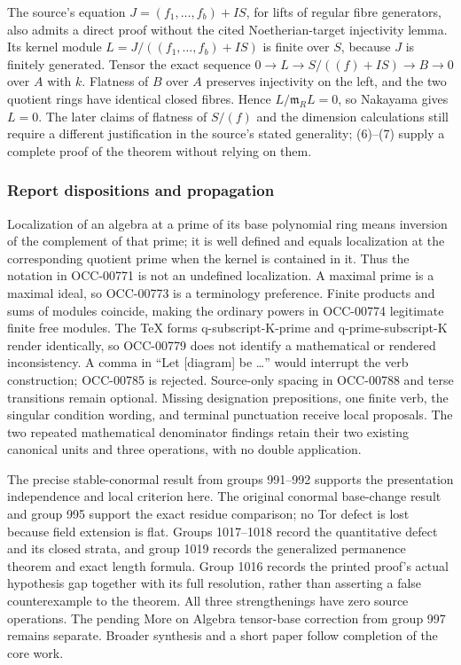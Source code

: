 The source's equation \(J=(f_1,\ldots,f_b)+IS\), for lifts of regular fibre generators, also admits a direct proof without the cited Noetherian-target injectivity lemma. Its kernel module \(L=J/((f_1,\ldots,f_b)+IS)\) is finite over \(S\), because \(J\) is finitely generated. Tensor the exact sequence \(0\to L\to S/((f)+IS)\to B\to0\) over \(A\) with \(k\). Flatness of \(B\) over \(A\) preserves injectivity on the left, and the two quotient rings have identical closed fibres. Hence \(L/\mathfrak m_RL=0\), so Nakayama gives \(L=0\). The later claims of flatness of \(S/(f)\) and the dimension calculations still require a different justification in the source's stated generality; (6)--(7) supply a complete proof of the theorem without relying on them.

\subsubsection{Report dispositions and propagation}\label{algebra-proof-045-report-dispositions-and-propagation}

Localization of an algebra at a prime of its base polynomial ring means inversion of the complement of that prime; it is well defined and equals localization at the corresponding quotient prime when the kernel is contained in it. Thus the notation in OCC-00771 is not an undefined localization. A maximal prime is a maximal ideal, so OCC-00773 is a terminology preference. Finite products and sums of modules coincide, making the ordinary powers in OCC-00774 legitimate finite free modules. The TeX forms q-subscript-K-prime and q-prime-subscript-K render identically, so OCC-00779 does not identify a mathematical or rendered inconsistency. A comma in ``Let {[}diagram{]} be \ldots'' would interrupt the verb construction; OCC-00785 is rejected. Source-only spacing in OCC-00788 and terse transitions remain optional. Missing designation prepositions, one finite verb, the singular condition wording, and terminal punctuation receive local proposals. The two repeated mathematical denominator findings retain their two existing canonical units and three operations, with no double application.

The precise stable-conormal result from groups 991--992 supports the presentation independence and local criterion here. The original conormal base-change result and group 995 support the exact residue comparison; no Tor defect is lost because field extension is flat. Groups 1017--1018 record the quantitative defect and its closed strata, and group 1019 records the generalized permanence theorem and exact length formula. Group 1016 records the printed proof's actual hypothesis gap together with its full resolution, rather than asserting a false counterexample to the theorem. All three strengthenings have zero source operations. The pending More on Algebra tensor-base correction from group 997 remains separate. Broader synthesis and a short paper follow completion of the core work.
